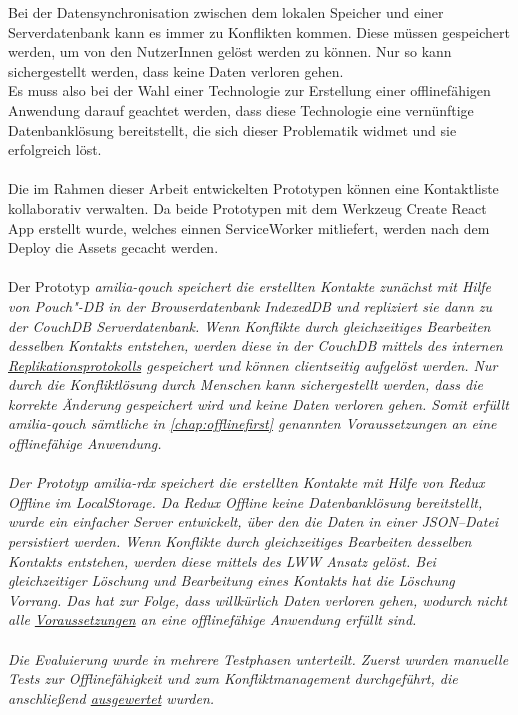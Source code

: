 Bei der Datensynchronisation zwischen dem lokalen Speicher und einer Serverdatenbank kann es immer zu Konflikten kommen.
Diese müssen gespeichert werden, um von den NutzerInnen gelöst werden zu können. Nur so kann sichergestellt werden, dass keine Daten verloren gehen.\\
Es muss also bei der Wahl einer Technologie zur Erstellung einer offlinefähigen Anwendung darauf geachtet werden, dass diese Technologie eine vernünftige Datenbanklösung bereitstellt, die sich dieser Problematik widmet und sie erfolgreich löst.\\\\
%
%
%
Die im Rahmen dieser Arbeit entwickelten Prototypen können eine Kontaktliste kollaborativ verwalten.
Da beide Prototypen mit dem Werkzeug Create React App erstellt wurde, welches einnen ServiceWorker mitliefert, werden nach dem Deploy die \gls{Assets} gecacht werden.\\\\
Der Prototyp \it{amilia-qouch} speichert die erstellten Kontakte zunächst mit Hilfe von Pouch"-DB in der Browserdatenbank IndexedDB und repliziert sie dann zu der CouchDB Serverdatenbank.
Wenn Konflikte durch gleichzeitiges Bearbeiten desselben Kontakts entstehen, werden diese in der CouchDB mittels des internen \hyperref[chap:replication]{Replikationsprotokolls} gespeichert und können clientseitig aufgelöst werden.
Nur durch die Konfliktlösung durch Menschen kann sichergestellt werden, dass die korrekte Änderung gespeichert wird und keine Daten verloren gehen.
Somit erfüllt \it{amilia-qouch} sämtliche in \autoref{chap:offlinefirst} genannten Voraussetzungen an eine offlinefähige Anwendung.\\\\
%
Der Prototyp \it{amilia-rdx} speichert die erstellten Kontakte mit Hilfe von Redux Offline im LocalStorage.
Da Redux Offline keine Datenbanklösung bereitstellt, wurde ein einfacher Server entwickelt, über den die Daten in einer \gls{JSON}--Datei persistiert werden.
Wenn Konflikte durch gleichzeitiges Bearbeiten desselben Kontakts entstehen, werden diese mittels des \gls{LWW} Ansatz gelöst.
Bei gleichzeitiger Löschung und Bearbeitung eines Kontakts hat die Löschung Vorrang.
Das hat zur Folge, dass willkürlich Daten verloren gehen, wodurch nicht alle \hyperref[chap:offlinefirst]{Voraussetzungen} an eine offlinefähige Anwendung erfüllt sind.\\\\
%
%
Die Evaluierung wurde in mehrere Testphasen unterteilt. Zuerst wurden manuelle Tests zur Offlinefähigkeit und zum Konfliktmanagement durchgeführt, die anschließend \hyperref[chap:testauswertung]{ausgewertet} wurden.
